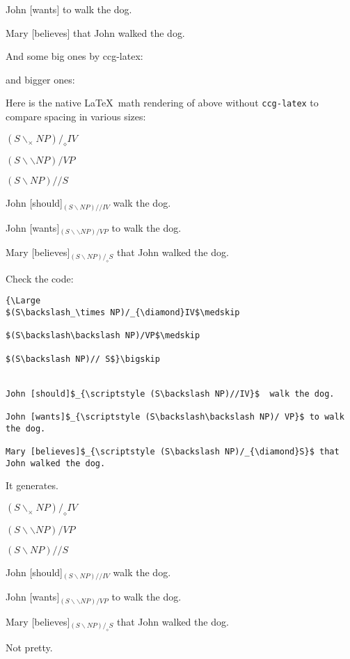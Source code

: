 \documentclass[11pt]{article}
\begin{document}
John [wants] to walk the dog.

Mary [believes] that John walked the dog.\bigskip

And some big ones by ccg-latex:\bigskip

{\large
{}\smallskip

\smallskip

\smallskip
}\bigskip

and bigger ones:\bigskip

{\Large
{}\smallskip

\smallskip

}\bigskip

Here is the native \LaTeX\, math rendering of above without \verb|ccg-latex| to compare spacing in various sizes:\bigskip

{\Large 
$(S\backslash_\times NP)/_{\diamond}IV$\medskip

$(S\backslash\backslash NP)/VP$\medskip

$(S\backslash NP)// S$}\bigskip


John [should]$_{\scriptstyle (S\backslash NP)//IV}$  walk the dog.

John [wants]$_{\scriptstyle (S\backslash\backslash NP)/ VP}$ to walk the dog.

Mary [believes]$_{\scriptstyle (S\backslash NP)/_{\diamond}S}$ that John walked the dog.
\newpage

Check the code:\footnotesize

\begin{verbatim}
{\Large 
$(S\backslash_\times NP)/_{\diamond}IV$\medskip

$(S\backslash\backslash NP)/VP$\medskip

$(S\backslash NP)// S$}\bigskip


John [should]$_{\scriptstyle (S\backslash NP)//IV}$  walk the dog.

John [wants]$_{\scriptstyle (S\backslash\backslash NP)/ VP}$ to walk the dog.

Mary [believes]$_{\scriptstyle (S\backslash NP)/_{\diamond}S}$ that John walked the dog.
\end{verbatim}\bigskip


\normalsize It generates. \bigskip

{\Large 
$(S\backslash_\times NP)/_{\diamond}IV$\medskip

$(S\backslash\backslash NP)/VP$\medskip

$(S\backslash NP)// S$}\bigskip


John [should]$_{\scriptstyle (S\backslash NP)//IV}$  walk the dog.

John [wants]$_{\scriptstyle (S\backslash\backslash NP)/ VP}$ to walk the dog.

Mary [believes]$_{\scriptstyle (S\backslash NP)/_{\diamond}S}$ that John walked the dog.\bigskip\bigskip

Not pretty.
\end{document}
